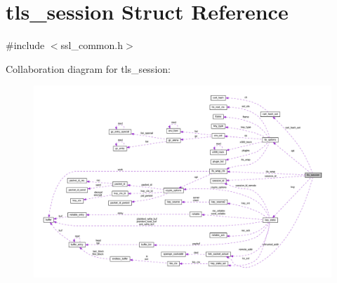 \hypertarget{structtls__session}{}\section{tls\+\_\+session Struct Reference}
\label{structtls__session}


{\ttfamily \#include $<$ssl\+\_\+common.\+h$>$}



Collaboration diagram for tls\+\_\+session\+:
\nopagebreak
\begin{figure}[H]
\begin{center}
\leavevmode
\includegraphics[width=350pt]{structtls__session__coll__graph}
\end{center}
\end{figure}
